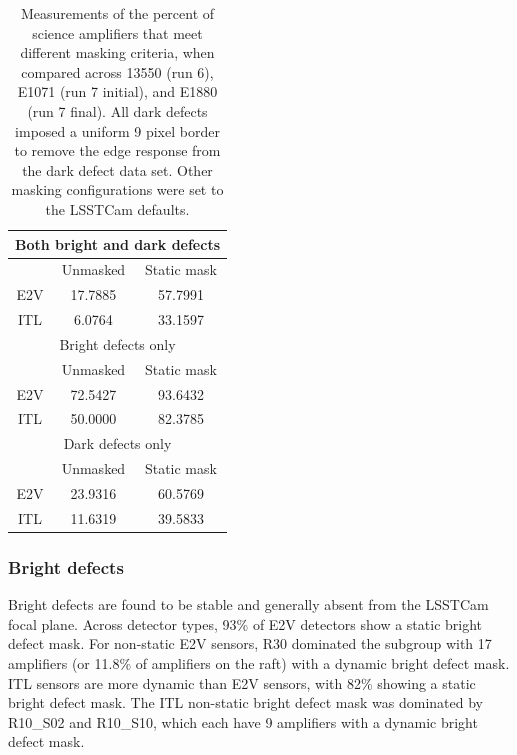 \begin{table}[ht]\label{table:defectStability:measurements}
\centering
\begin{tabular}{|ccc|}
\hline
\multicolumn{3}{|c|}{Both bright and dark defects}                      \\ \hline
\multicolumn{1}{|c|}{}    & \multicolumn{1}{c|}{Unmasked} & Static mask \\ \hline
\multicolumn{1}{|c|}{E2V} & \multicolumn{1}{c|}{17.7885}  & 57.7991     \\ \hline
\multicolumn{1}{|c|}{ITL} & \multicolumn{1}{c|}{6.0764}   & 33.1597     \\ \hline
\multicolumn{3}{|c|}{Bright defects only}                               \\ \hline
\multicolumn{1}{|c|}{}    & \multicolumn{1}{c|}{Unmasked} & Static mask \\ \hline
\multicolumn{1}{|c|}{E2V} & \multicolumn{1}{c|}{72.5427}  & 93.6432     \\ \hline
\multicolumn{1}{|c|}{ITL} & \multicolumn{1}{c|}{50.0000}  & 82.3785     \\ \hline
\multicolumn{3}{|c|}{Dark defects only}                                 \\ \hline
\multicolumn{1}{|c|}{}    & \multicolumn{1}{c|}{Unmasked} & Static mask \\ \hline
\multicolumn{1}{|c|}{E2V} & \multicolumn{1}{c|}{23.9316}  & 60.5769     \\ \hline
\multicolumn{1}{|c|}{ITL} & \multicolumn{1}{c|}{11.6319}  & 39.5833     \\ \hline
\end{tabular}
\caption{Measurements of the percent of science amplifiers that meet different masking criteria, when compared across 13550 (run 6), E1071 (run 7 initial), and E1880 (run 7 final). All dark defects imposed a uniform 9 pixel border to remove the edge response from the dark defect data set. Other masking configurations were set to the LSSTCam defaults.}
\end{table}

\subsubsection{Bright defects}

Bright defects are found to be stable and generally absent from the LSSTCam focal plane. Across detector types, 93\% of E2V detectors show a static bright defect mask. For non-static E2V sensors, R30 dominated the subgroup with 17 amplifiers (or 11.8\% of amplifiers on the raft) with a dynamic bright defect mask. ITL sensors are more dynamic than E2V sensors, with 82\% showing a static bright defect mask. The ITL non-static bright defect mask was dominated by R10\_S02 and R10\_S10, which each have 9 amplifiers with a dynamic bright defect mask.

